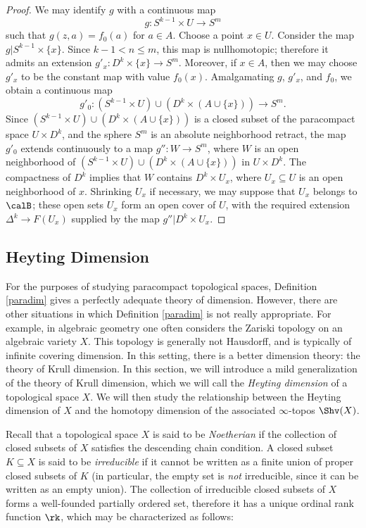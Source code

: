\begin{proof}
We may identify $g$ with a continuous map
$$g: S^{k-1} \times U \rightarrow S^{m}$$
such that $g( z, a) = f_0(a)$ for $a \in A$. Choose a point $x \in U$.
Consider the map $g| S^{k-1} \times \{x\}$. Since $k-1 < n \leq m$, this map is nullhomotopic;
therefore it admits an extension $g'_{x}: D^k \times \{x\} \rightarrow S^m$. Moreover, if
$x \in A$, then we may choose $g'_{x}$ to be the constant map with value $f_0(x)$.
Amalgamating $g$, $g'_{x}$, and $f_0$, we obtain a continuous map
$$ g'_{0}: (S^{k-1} \times U) \cup (D^k \times ( A \cup \{x\} ) ) \rightarrow S^m.$$
Since $(S^{k-1} \times U) \cup (D^k \times (A \cup \{x\}))$ is a closed subset of
the paracompact space $U \times D^k$, and the sphere $S^m$ is an absolute
neighborhood retract, the map $g'_0$ extends continuously to a map $g'': W \rightarrow S^m$,
where $W$ is an open neighborhood of $(S^{k-1} \times U) \cup (D^k \times (A \cup \{x\}))$
in $U \times D^k$. The compactness of $D^k$ implies that $W$ contains
$D^k \times U_x$, where $U_x \subseteq U$ is an open neighborhood of $x$.
Shrinking $U_x$ if necessary, we may suppose that $U_x$ belongs to $\calB$;
these open sets $U_x$ form an open cover of $U$, with the required
extension $\Delta^k \rightarrow F(U_x)$ supplied by the map $g'' | D^k \times U_x$.
\end{proof}

\subsection{Heyting Dimension}\label{heyt}

For the purposes of studying paracompact topological spaces, Definition \ref{paradim}
gives a perfectly adequate theory of dimension. However, there are other situations in which
Definition \ref{paradim} is not really appropriate. For example, in algebraic geometry one often considers the Zariski topology on an algebraic variety $X$. This topology is generally not Hausdorff, and is typically of infinite covering dimension. In this setting, there is a better dimension theory: the theory of Krull dimension. In this section, we will introduce a mild generalization of the theory of Krull dimension, which we will call the {\it Heyting dimension} of a topological space $X$. We will then study the relationship between the Heyting dimension of $X$ and the homotopy dimension of the associated $\infty$-topos $\Shv(X)$.

Recall that a topological space $X$ is said to be {\it Noetherian} if the collection of closed subsets of $X$ satisfies the descending chain condition. A closed subset $K \subseteq X$ is said to be
{\it irreducible} if it cannot be written as a finite union of proper closed subsets of $K$ (in particular, the empty set is {\em not} irreducible, since it can be written as an empty union).
The collection of irreducible closed subsets of $X$ forms a well-founded partially ordered set, therefore it has a unique ordinal rank function $\rk$, which may be characterized as follows:

